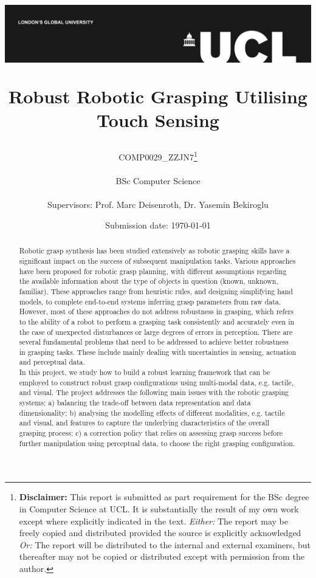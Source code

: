 \documentclass[11pt, a4paper]{report}
\title{{\vspace{-2in}\includegraphics[width=\textwidth]{docs/Project Report/Media/ucl_logo.png}}\\
\vspace{2cm}
\begin{adjustwidth}{1cm}{1cm}
    \centering
    \Huge Robust Robotic Grasping Utilising Touch Sensing
\end{adjustwidth}}
\date{Submission date: \today}
\author{COMP0029\_ZZJN7\thanks{
{\bf Disclaimer:}
This report is submitted as part requirement for the BSc degree in Computer Science at UCL. It is
substantially the result of my own work except where explicitly indicated in the text.
\emph{Either:} The report may be freely copied and distributed provided the source is explicitly acknowledged
\newline
\emph{Or:}\newline
The report will be distributed to the internal and external examiners, but thereafter may not be copied or distributed except with permission from the author.}
\\ \\
BSc Computer Science\\ \\
Supervisors: Prof. Marc Deisenroth, Dr. Yasemin Bekiroglu}
\begin{document}
\onehalfspacing
\maketitle
{}

\begin{abstract}
Robotic grasp synthesis has been studied extensively as robotic grasping skills have a significant impact on the success of subsequent manipulation tasks. Various approaches have been proposed for robotic grasp planning, with different assumptions regarding the available information about the type of objects in question (known, unknown, familiar). These approaches range from heuristic rules, and designing simplifying hand models, to complete end-to-end systems inferring grasp parameters from raw data.\\

However, most of these approaches do not address robustness in grasping, which refers to the ability of a robot to perform a grasping task consistently and accurately even in the case of unexpected disturbances or large degrees of errors in perception. There are several fundamental problems that need to be addressed to achieve better robustness in grasping tasks. These include mainly dealing with uncertainties in sensing, actuation and perceptual data.\\

In this project, we study how to build a robust learning framework that can be employed to construct robust grasp configurations using multi-modal data, e.g. tactile, and visual. The project addresses the following main issues with the robotic grasping systems: a) balancing the trade-off between data representation and data dimensionality; b) analysing the modelling effects of different modalities, e.g. tactile and visual, and features to capture the underlying characteristics of the overall grasping process; c) a correction policy that relies on assessing grasp success before further manipulation using perceptual data, to choose the right grasping configuration.
\end{abstract}


\renewcommand\abstractname{Acknowledgements}
\begin{abstract}
    
\end{abstract}
\end{document}
